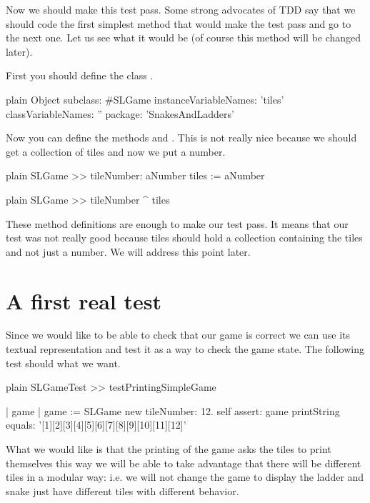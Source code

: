 \documentclass[10pt,twoside,english]{_support/latex/sbabook/sbabook}
\begin{document}
Now we should make this test pass. Some strong advocates of TDD say that we should code 
the first simplest method that would make the test pass and go to the next one. 
Let us see what it would be (of course this method will be changed later).

First you should define the class .

\begin{displaycode}{plain}
Object subclass: #SLGame
	instanceVariableNames: 'tiles'
	classVariableNames: ''
	package: 'SnakesAndLadders'
\end{displaycode}

Now you can define the methods  and . This is not really nice because we should get a collection of tiles and now we put a number.

\begin{displaycode}{plain}
SLGame >> tileNumber: aNumber
	tiles := aNumber
\end{displaycode}

\begin{displaycode}{plain}
SLGame >> tileNumber
	^ tiles
\end{displaycode}

These method definitions are enough to make our test pass. It means that our test was not really good because tiles should hold a collection containing the tiles and not just a number. We will address this point later.
\section{A first real test}
Since we would like to be able to check that our game is correct we can use its textual representation and test it as a way to check the game state. 
The following test should what we want. 

\begin{displaycode}{plain}
SLGameTest >> testPrintingSimpleGame

	| game |
	game := SLGame new tileNumber: 12.
	self 
		assert: game printString 
		equals: '[1][2][3][4][5][6][7][8][9][10][11][12]'
\end{displaycode}

What we would like is that the printing of the game asks the tiles to print themselves this way we will be able to take advantage that there will be different tiles in a modular way: i.e. we will not change the game to display the ladder and snake just have different tiles with different behavior. 
\end{document}
